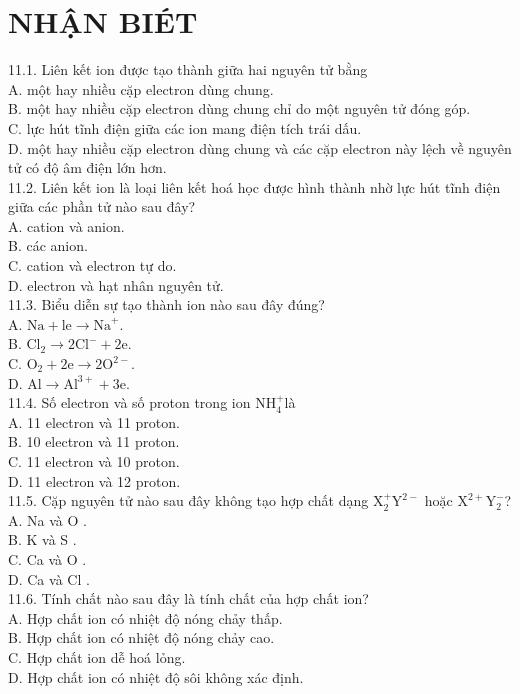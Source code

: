 \documentclass[10pt]{article}
\begin{document}
\section*{NHẬN BIÉT}
11.1. Liên kết ion được tạo thành giữa hai nguyên tử bằng\\
A. một hay nhiều cặp electron dùng chung.\\
B. một hay nhiều cặp electron dùng chung chỉ do một nguyên tử đóng góp.\\
C. lực hút tĩnh điện giữa các ion mang điện tích trái dấu.\\
D. một hay nhiều cặp electron dùng chung và các cặp electron này lệch về nguyên tử có độ âm điện lớn hơn.\\
11.2. Liên kết ion là loại liên kết hoá học được hình thành nhờ lực hút tĩnh điện giữa các phần tử nào sau đây?\\
A. cation và anion.\\
B. các anion.\\
C. cation và electron tự do.\\
D. electron và hạt nhân nguyên tử.\\
11.3. Biểu diễn sự tạo thành ion nào sau đây đúng?\\
A. $\mathrm{Na}+\mathrm{le} \rightarrow \mathrm{Na}^{+}$.\\
B. $\mathrm{Cl}_{2} \rightarrow 2 \mathrm{Cl}^{-}+2 \mathrm{e}$.\\
C. $\mathrm{O}_{2}+2 \mathrm{e} \rightarrow 2 \mathrm{O}^{2-}$.\\
D. $\mathrm{Al} \rightarrow \mathrm{Al}^{3+}+3 \mathrm{e}$.\\
11.4. Số electron và số proton trong ion $\mathrm{NH}_{4}^{+}$là\\
A. 11 electron và 11 proton.\\
B. 10 electron và 11 proton.\\
C. 11 electron và 10 proton.\\
D. 11 electron và 12 proton.\\
11.5. Cặp nguyên tử nào sau đây không tạo hợp chất dạng $\mathrm{X}_{2}^{+} \mathrm{Y}^{2-}$ hoặc $\mathrm{X}^{2+} \mathrm{Y}_{2}^{-}$?\\
A. Na và O .\\
B. K và S .\\
C. Ca và O .\\
D. Ca và Cl .\\
11.6. Tính chất nào sau đây là tính chất của hợp chất ion?\\
A. Hợp chất ion có nhiệt độ nóng chảy thấp.\\
B. Hợp chất ion có nhiệt độ nóng chảy cao.\\
C. Hợp chất ion dễ hoá lỏng.\\
D. Hợp chất ion có nhiệt độ sôi không xác định.
\end{document}
